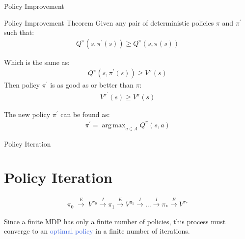 \documentclass{beamer}
\DeclareMathOperator*{\argmax}{arg\,max}
\begin{document}
\begin{frame}{Policy Improvement}


\begin{block}{Policy Improvement Theorem}
Given any pair of deterministic policies $\pi$ and $\pi^{\prime}$ such that:
\begin{align*}
Q^{\pi}(s, \pi^{\prime}(s)) \geq Q^{\pi}(s, \pi(s))
\end{align*}

Which is the same as:
\begin{align*}
Q^{\pi}(s, \pi^{\prime}(s)) \geq V^{\pi}(s)
\end{align*}
Then policy $\pi^{\prime}$ is as good as or better than $\pi$:
\begin{align*}
    V^{\pi^{\prime}}(s) \geq V^{\pi}(s)
\end{align*}
\end{block}

\hspace{1mm}

The new policy $\pi^{\prime}$ can be found as:
\begin{align*}
    \pi^{\prime} = \argmax_{a \in A} Q^{\pi}(s,a)
\end{align*}

\end{frame}

\begin{frame}{Policy Iteration}
\section{Policy Iteration}

\begin{align*}
\pi_0 \; \overset{E}{\longrightarrow} \; V^{\pi_0} \overset{I}\longrightarrow \pi_1 \overset{E}\longrightarrow V^{\pi_1} \overset{I}\longrightarrow . . . \overset{I}\longrightarrow \pi_{*} \overset{E}\longrightarrow V^{\pi_*}
\end{align*}

Since a finite MDP has only a finite number of policies, this process must converge to an \textcolor{RoyalBlue}{optimal policy} in a finite number of iterations.

\end{frame}
\end{document}
